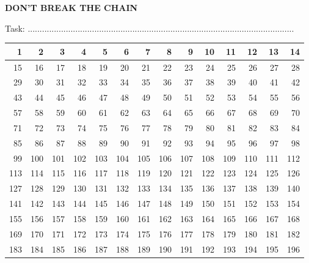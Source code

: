\documentclass[a4paper, 17pt]{extarticle}       %
\begin{document}
\begin{center}
{\LARGE \textbf{DON'T BREAK THE CHAIN}}
\end{center}

\noindent
Task: ................................................................................................................ \\

\centering
\begin{tabular}{|r|r|r|r|r|r|r|r|r|r|r|r|r|r|}
\hline
  1  &    2  &    3  &    4  &    5  &    6  &    7  &    8  &    9  &   10  &   11  &   12  &   13  &   14  \\ \hline
 15  &   16  &   17  &   18  &   19  &   20  &   21  &   22  &   23  &   24  &   25  &   26  &   27  &   28  \\ \hline
 29  &   30  &   31  &   32  &   33  &   34  &   35  &   36  &   37  &   38  &   39  &   40  &   41  &   42  \\ \hline
 43  &   44  &   45  &   46  &   47  &   48  &   49  &   50  &   51  &   52  &   53  &   54  &   55  &   56  \\ \hline
 57  &   58  &   59  &   60  &   61  &   62  &   63  &   64  &   65  &   66  &   67  &   68  &   69  &   70  \\ \hline
 71  &   72  &   73  &   74  &   75  &   76  &   77  &   78  &   79  &   80  &   81  &   82  &   83  &   84  \\ \hline
 85  &   86  &   87  &   88  &   89  &   90  &   91  &   92  &   93  &   94  &   95  &   96  &   97  &   98  \\ \hline
 99  &  100  &  101  &  102  &  103  &  104  &  105  &  106  &  107  &  108  &  109  &  110  &  111  &  112  \\ \hline
113  &  114  &  115  &  116  &  117  &  118  &  119  &  120  &  121  &  122  &  123  &  124  &  125  &  126  \\ \hline
127  &  128  &  129  &  130  &  131  &  132  &  133  &  134  &  135  &  136  &  137  &  138  &  139  &  140  \\ \hline
141  &  142  &  143  &  144  &  145  &  146  &  147  &  148  &  149  &  150  &  151  &  152  &  153  &  154  \\ \hline
155  &  156  &  157  &  158  &  159  &  160  &  161  &  162  &  163  &  164  &  165  &  166  &  167  &  168  \\ \hline
169  &  170  &  171  &  172  &  173  &  174  &  175  &  176  &  177  &  178  &  179  &  180  &  181  &  182  \\ \hline
183  &  184  &  185  &  186  &  187  &  188  &  189  &  190  &  191  &  192  &  193  &  194  &  195  &  196  \\ \hline

\end{tabular}
\end{document}
